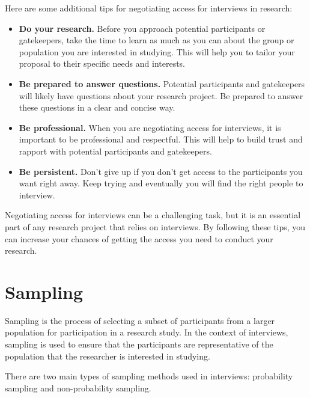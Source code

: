 \documentclass[
  b5paper]{book}
\begin{document}
Here are some additional tips for negotiating access for interviews in research:

\begin{itemize}
\item
  \textbf{Do your research.} Before you approach potential participants or gatekeepers, take the time to learn as much as you can about the group or population you are interested in studying. This will help you to tailor your proposal to their specific needs and interests.
\item
  \textbf{Be prepared to answer questions.} Potential participants and gatekeepers will likely have questions about your research project. Be prepared to answer these questions in a clear and concise way.
\item
  \textbf{Be professional.} When you are negotiating access for interviews, it is important to be professional and respectful. This will help to build trust and rapport with potential participants and gatekeepers.
\item
  \textbf{Be persistent.} Don't give up if you don't get access to the participants you want right away. Keep trying and eventually you will find the right people to interview.
\end{itemize}

Negotiating access for interviews can be a challenging task, but it is an essential part of any research project that relies on interviews. By following these tips, you can increase your chances of getting the access you need to conduct your research.

\hypertarget{sampling}{%
\section{Sampling}\label{sampling}}

Sampling is the process of selecting a subset of participants from a larger population for participation in a research study. In the context of interviews, sampling is used to ensure that the participants are representative of the population that the researcher is interested in studying.

There are two main types of sampling methods used in interviews: probability sampling and non-probability sampling.
\end{document}
